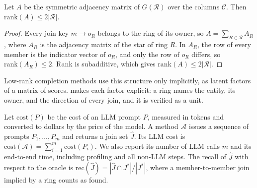 \begin{proposition}
\label{prop:rank}
Let $A$ be the symmetric adjacency matrix of $G(\mathcal{R})$ over the columns $\mathcal{C}$. Then $\mathrm{rank}(A) \leq 2|\mathcal{R}|$.
\end{proposition}

\begin{proof}
Every join key $m \rightarrow o_R$ belongs to the ring of its owner, so $A = \sum_{R \in \mathcal{R}} A_R$, where $A_R$ is the adjacency matrix of the star of ring $R$.
In $A_R$, the row of every member is the indicator vector of $o_R$, and only the row of $o_R$ differs, so $\mathrm{rank}(A_R) \leq 2$.
Rank is subadditive, which gives $\mathrm{rank}(A) \leq 2|\mathcal{R}|$.
\end{proof}

Low-rank completion methods use this structure only implicitly, as latent factors of a matrix of scores.
\ourmethod makes each factor explicit: a ring names the entity, its owner, and the direction of every join, and it is verified as a unit.

 Let $\mathrm{cost}(P)$ be the cost of an LLM prompt $P$, measured in tokens and converted to dollars by the price of the model.
A method $\mathcal{A}$ issues a sequence of prompts $P_1, \ldots, P_m$ and returns a join set $\hat{J}$.
Its LLM cost is $\mathrm{cost}(\mathcal{A}) = \sum_{i=1}^{m} \mathrm{cost}(P_i)$.
We also report its number of LLM calls $m$ and its end-to-end time, including profiling and all non-LLM steps.
The recall of $\hat{J}$ with respect to the oracle is $\mathrm{rec}(\hat{J}) = |\hat{J} \cap J^*| / |J^*|$, where a member-to-member join implied by a ring counts as found.

